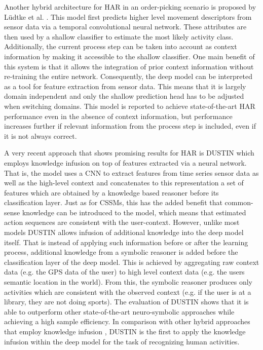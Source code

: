\documentclass[11pt,titlepage,oneside,openany]{book}
\begin{document}
Another hybrid architecture for HAR in an order-picking scenario is proposed by L\"udtke et al. \cite{ludtke_human_2021}. This model first predicts higher level movement descriptors from sensor data via a temporal convolutional neural network. These attributes are then used by a shallow classifier to estimate the most likely activity class. Additionally, the current process step can be taken into account as context information by making it accessible to the shallow classifier. One main benefit of this system is that it allows the integration of prior context information without re-training the entire network. Consequently, the deep model can be interpreted as a tool for feature extraction from sensor data. This means that it is largely domain independent and only the shallow prediction head has to be adjusted when switching domains. This model is reported to achieve state-of-the-art HAR performance even in the absence of context information, but performance increases further if relevant information from the process step is included, even if it is not always correct.

A very recent approach that shows promising results for HAR is DUSTIN \cite{arrotta_knowledge_2022} which employs knowledge infusion on top of features extracted via a neural network. That is, the model uses a CNN to extract features from time series sensor data as well as the high-level context and concatenates to this representation a set of features which are obtained by a knowledge based reasoner before its classification layer. Just as for CSSMs, this has the added benefit that common-sense knowledge can be introduced to the model, which means that estimated action sequences are consistent with the user-context. However, unlike most models DUSTIN allows infusion of additional knowledge into the deep model itself. That is instead of applying such information before or after the learning process, additional knowledge from a symbolic reasoner is added before the classification layer of the deep model. This is achieved by aggregating raw context data (e.g. the GPS data of the user) to high level context data (e.g. the users semantic location in the world). From this, the symbolic reasoner produces only activities which are consistent with the observed context (e.g. if the user is at a library, they are not doing sports). The evaluation of DUSTIN shows that it is able to outperform other state-of-the-art neuro-symbolic approaches while achieving a high sample efficiency. In comparison with other hybrid approaches that employ knowledge infusion \cite{bettini_caviar_2020, sukor_hybrid_2019}, DUSTIN is the first to apply the knowledge infusion within the deep model for the task of recognizing human activities.
\end{document}

